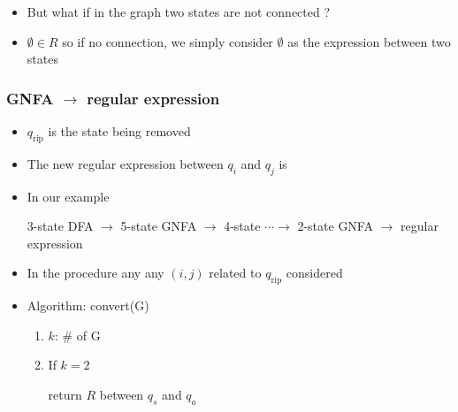 \begin{frame}[allowframebreaks]
\begin{itemize}
\item [] But what if in the graph two states are not connected ?

\item [] $\emptyset \in R$ so if no connection, we simply consider
  $\emptyset$ as the expression between two states
\end{itemize}\end{frame} \begin{frame}[allowframebreaks] \frametitle{GNFA $\rightarrow$ regular expression}
\begin{itemize}
\item $q_{\text{rip}}$ is the state being removed
  \begin{center}
\end{center}
\item The new regular expression between $q_i$ and $q_j$ is

  \begin{center}
\end{center}
\item In our example
  
3-state DFA $\rightarrow $ 5-state GNFA
$\rightarrow$ 4-state $\cdots \rightarrow$ 2-state GNFA $\rightarrow$
regular expression
\item In the procedure any any $(i,j)$ related to $q_{\text{rip}}$ considered
\item Algorithm: convert(G)
  \begin{enumerate}
  \item $k$: \# of G
  \item If $k=2$
    \begin{center}
      return $R$ between $q_s$ and $q_a$
    \end{center}


\end{enumerate}
\end{itemize}
\end{frame}
